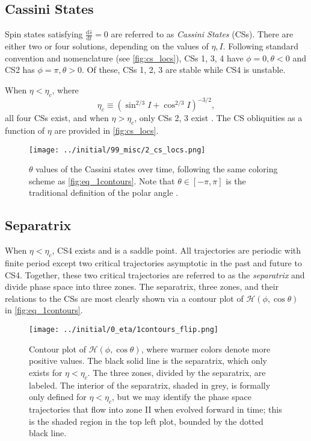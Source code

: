 \documentclass[
        fleqn,
        usenatbib,
    ]{mnras}
\newcommand*{\rd}[2]{\frac{\mathrm{d}#1}{\mathrm{d}#2}}
\newcommand*{\p}[1]{\left(#1\right)}
\begin{document}
\subsection{Cassini States}\label{ss:cs}

Spin states satisfying $\rd{\hat{s}}{t} = 0$ are referred to as \emph{Cassini
States} (CSs). There are either two or four solutions, depending on the values
of $\eta, I$. Following standard convention and nomenclature (see
\autoref{fig:cs_locs}), CSs 1, 3, 4 have $\phi = 0, \theta < 0$ and CS2 has
$\phi = \pi, \theta > 0$. Of these, CSs 1, 2, 3 are stable while CS4 is
unstable.

When $\eta < \eta_c$, where
\begin{equation}
    \eta_c \equiv \p{\sin^{2/3}I + \cos^{2/3}I}^{-3/2},
\end{equation}
all four CSs exist, and when $\eta > \eta_c$, only CSs 2, 3 exist
\citep{henrard1987,ward2004I}. The CS obliquities as a function of $\eta$ are
provided in \autoref{fig:cs_locs}.
\begin{figure}
    \centering
    \texttt{[image: ../initial/99\_misc/2\_cs\_locs.png]}
    \caption{$\theta$ values of the Cassini states over time, following the same
    coloring scheme as \autoref{fig:eq_1contours}. Note that $\theta \in [-\pi,
    \pi]$ is the traditional definition of the polar angle
    \citep[see e.g.][]{colombo1966,peale1969,henrard1987}.}\label{fig:cs_locs}
\end{figure}

\subsection{Separatrix}

When $\eta < \eta_c$, CS4 exists and is a saddle point. All trajectories are
periodic with finite period except two critical trajectories asymptotic in the
past and future to CS4. Together, these two critical trajectories are referred
to as the \emph{separatrix} and divide phase space into three zones. The
separatrix, three zones, and their relations to the CSs are most clearly shown
via a contour plot of $\mathcal{H}\p{\phi, \cos \theta}$ in
\autoref{fig:eq_1contours}.
\begin{figure*}
    \centering
    \texttt{[image: ../initial/0\_eta/1contours\_flip.png]}
    \caption{Contour plot of $\mathcal{H}\p{\phi, \cos \theta}$, where warmer
    colors denote more positive values. The black solid line is the separatrix,
    which only exists for $\eta < \eta_c$. The three zones, divided by the
    separatrix, are labeled. The interior of the separatrix, shaded in grey, is
    formally only defined for $\eta < \eta_c$, but we may identify the phase
    space trajectories that flow into zone II when evolved forward in time; this
    is the shaded region in the top left plot, bounded by the dotted black
    line.}\label{fig:eq_1contours}
\end{figure*}
\end{document}
